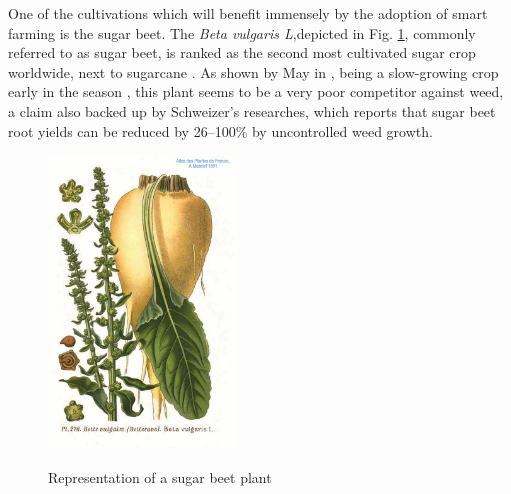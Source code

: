 One of the cultivations which will benefit immensely by the adoption of smart farming is the sugar beet. The \textit{Beta vulgaris L},depicted in Fig. \ref{fig:sugar_beet}, commonly referred to as sugar beet, is ranked as the second most cultivated  sugar crop worldwide, next to sugarcane \cite{bhadra_weed_2020}. As shown by May in \cite{may_economic_2003}, being a slow-growing crop early in the season \cite{bhadra_weed_2020}, this plant seems to be a very poor competitor against weed, a claim also backed up by Schweizer's researches, which reports that sugar beet root yields can be reduced by 26–100\% by uncontrolled weed growth.  \cite{schweizer_weed_1989}\\
\begin{figure}[ht]
	\centering
	\includegraphics[width = 5cm]{img/276_Beta_vulgaris_L.jpg}
	\caption[Representation of a sugar beet plant]{Representation of a sugar beet plant \cite{masclef_sugar_1891} }{\centering}
	\label{fig:sugar_beet}
\end{figure}
